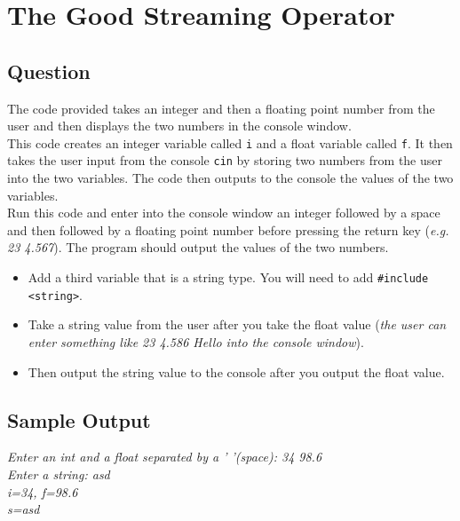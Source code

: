 \section{The Good Streaming Operator}
    \subsection*{Question}
    The code provided takes an integer and then a floating point number from the user and then displays the two numbers in the console window. \\
        
    This code creates an integer variable called \texttt{i} and a float variable called \texttt{f}. 
    It then takes the user input from the console \texttt{cin} by storing two numbers from the user into the two variables. 
    The code then outputs to the console the values of the two variables. \\
        
    Run this code and enter into the console window an integer followed by a space and then followed by a floating point number before pressing the return key (\textit{e.g. 23  4.567}). 
    The program should output the values of the two numbers.\\

    \begin{itemize}
        \item Add a third variable that is a string type. You will need to add \texttt{#include <string>}.

        \item Take a string value from the user after you take the float value (\textit{the user can enter something like 23  4.586  Hello into the console window}).

        \item Then output the string value to the console after you output the float value.
    \end{itemize}
        
    \subsection*{Sample Output}
        \noindent\textit{
            Enter an int and a float separated by a ' '(space): 34 98.6\\
            Enter a string: asd\\
            i=34, f=98.6\\
            s=asd\\
        }

